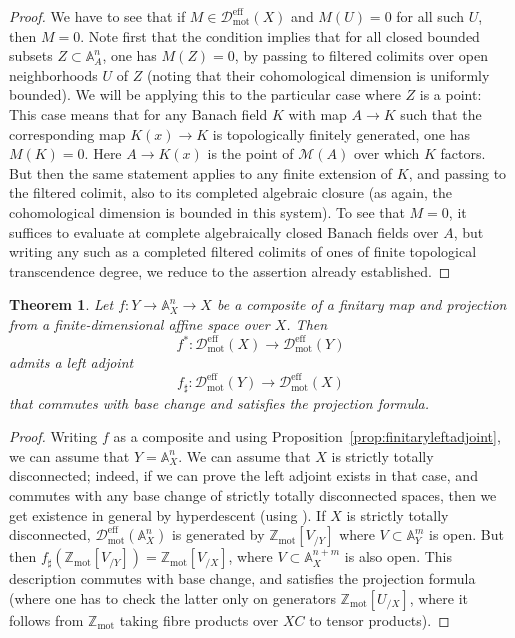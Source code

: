 \documentclass[11pt]{amsart}
\numberwithin{equation}{section}
\newtheorem{theorem}{Theorem}
\numberwithin{theorem}{section}
\theoremstyle{definition}
\begin{document}
\begin{proof} We have to see that if $M\in \mathcal D_{\mathrm{mot}}^{\mathrm{eff}}(X)$ and $M(U)=0$ for all such $U$, then $M=0$. Note first that the condition implies that for all closed bounded subsets $Z\subset \mathbb A^n_A$, one has $M(Z)=0$, by passing to filtered colimits over open neighborhoods $U$ of $Z$ (noting that their cohomological dimension is uniformly bounded). We will be applying this to the particular case where $Z$ is a point: This case means that for any Banach field $K$ with map $A\to K$ such that the corresponding map $K(x)\to K$ is topologically finitely generated, one has $M(K)=0$. Here $A\to K(x)$ is the point of $\mathcal M(A)$ over which $K$ factors. But then the same statement applies to any finite extension of $K$, and passing to the filtered colimit, also to its completed algebraic closure (as again, the cohomological dimension is bounded in this system). To see that $M=0$, it suffices to evaluate at complete algebraically closed Banach fields over $A$, but writing any such as a completed filtered colimits of ones of finite topological transcendence degree, we reduce to the assertion already established.
\end{proof}

\begin{theorem} Let $f: Y\to \mathbb A^n_X\to X$ be a composite of a finitary map and projection from a finite-dimensional affine space over $X$. Then
\[
f^\ast: \mathcal D_{\mathrm{mot}}^{\mathrm{eff}}(X)\to \mathcal D_{\mathrm{mot}}^{\mathrm{eff}}(Y)
\]
admits a left adjoint
\[
f_\sharp: \mathcal D_{\mathrm{mot}}^{\mathrm{eff}}(Y)\to \mathcal D_{\mathrm{mot}}^{\mathrm{eff}}(X)
\]
that commutes with base change and satisfies the projection formula.
\end{theorem}

\begin{proof} Writing $f$ as a composite and using Proposition~\ref{prop:finitaryleftadjoint}, we can assume that $Y=\mathbb A^n_X$. We can assume that $X$ is strictly totally disconnected; indeed, if we can prove the left adjoint exists in that case, and commutes with any base change of strictly totally disconnected spaces, then we get existence in general by hyperdescent (using \cite[Proposition 4.7.4.18]{LurieHA}). If $X$ is strictly totally disconnected, $\mathcal D_{\mathrm{mot}}^{\mathrm{eff}}(\mathbb A^n_X)$ is generated by $\mathbb Z_{\mathrm{mot}}[V_{/Y}]$ where $V\subset \mathbb A^m_Y$ is open. But then $f_\sharp(\mathbb Z_{\mathrm{mot}}[V_{/Y}]) = \mathbb Z_{\mathrm{mot}}[V_{/X}]$, where $V\subset \mathbb A^{n+m}_X$ is also open. This description commutes with base change, and satisfies the projection formula (where one has to check the latter only on generators $\mathbb Z_{\mathrm{mot}}[U_{/X}]$, where it follows from $\mathbb Z_{\mathrm{mot}}$ taking fibre products over $XC$ to tensor products).
\end{proof}
\end{document}
